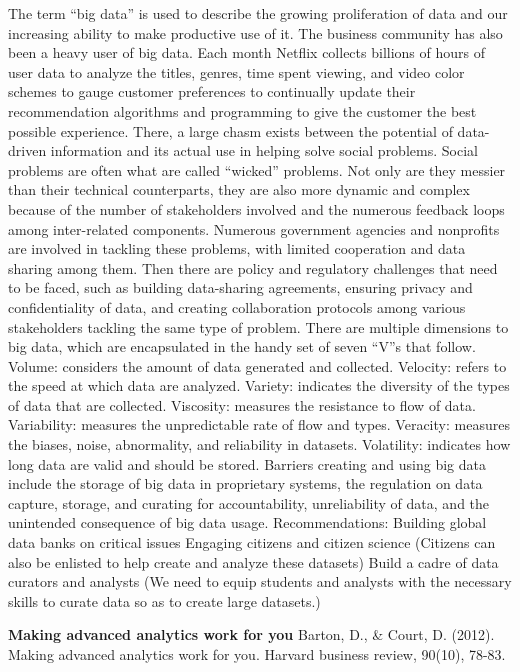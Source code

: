\documentclass[]{book}
\theoremstyle{definition}
\theoremstyle{definition}
\theoremstyle{definition}
\theoremstyle{remark}
\begin{document}
The term ``big data'' is used to describe the growing proliferation of
data and our increasing ability to make productive use of it. The
business community has also been a heavy user of big data. Each month
Netflix collects billions of hours of user data to analyze the titles,
genres, time spent viewing, and video color schemes to gauge customer
preferences to continually update their recommendation algorithms and
programming to give the customer the best possible experience. There, a
large chasm exists between the potential of data-driven information and
its actual use in helping solve social problems. Social problems are
often what are called ``wicked'' problems. Not only are they messier
than their technical counterparts, they are also more dynamic and
complex because of the number of stakeholders involved and the numerous
feedback loops among inter-related components. Numerous government
agencies and nonprofits are involved in tackling these problems, with
limited cooperation and data sharing among them. Then there are policy
and regulatory challenges that need to be faced, such as building
data-sharing agreements, ensuring privacy and confidentiality of data,
and creating collaboration protocols among various stakeholders tackling
the same type of problem. There are multiple dimensions to big data,
which are encapsulated in the handy set of seven ``V''s that follow.
Volume: considers the amount of data generated and collected. Velocity:
refers to the speed at which data are analyzed. Variety: indicates the
diversity of the types of data that are collected. Viscosity: measures
the resistance to flow of data. Variability: measures the unpredictable
rate of flow and types. Veracity: measures the biases, noise,
abnormality, and reliability in datasets. Volatility: indicates how long
data are valid and should be stored. Barriers creating and using big
data include the storage of big data in proprietary systems, the
regulation on data capture, storage, and curating for accountability,
unreliability of data, and the unintended consequence of big data usage.
Recommendations: Building global data banks on critical issues Engaging
citizens and citizen science (Citizens can also be enlisted to help
create and analyze these datasets) Build a cadre of data curators and
analysts (We need to equip students and analysts with the necessary
skills to curate data so as to create large datasets.)

\textbf{Making advanced analytics work for you} Barton, D., \& Court, D.
(2012). Making advanced analytics work for you. Harvard business review,
90(10), 78-83.
\end{document}
